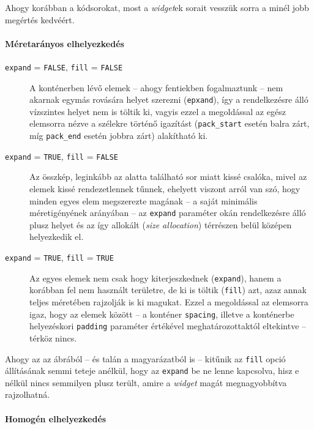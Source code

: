 Ahogy korábban a kódsorokat, most a \textit{widget}ek sorait vesszük sorra a minél jobb megértés kedvéért.

\paragraph{Méretarányos elhelyezkedés}

\begin{description}
 \item[\texttt{expand} = \texttt{FALSE}, \texttt{fill} = \texttt{FALSE}] A konténerben lévő elemek -- ahogy fentiekben fogalmaztunk -- nem akarnak egymás rovására helyet szerezni (\texttt{epxand}), így a rendelkezésre álló vízszintes helyet nem is töltik ki, vagyis ezzel a megoldással az egész elemsorra nézve a szélekre történő igazítást (\texttt{pack\_start} esetén balra zárt, míg \texttt{pack\_end} esetén jobbra zárt) alakítható ki.

 \item[\texttt{expand} = \texttt{TRUE}, \texttt{fill} = \texttt{FALSE}] Az összkép, leginkább az alatta található sor miatt kissé csalóka, mivel az elemek kissé rendezetlennek tűnnek, ehelyett viszont arról van szó, hogy minden egyes elem megszerezte magának -- a saját minimális méretigényének arányában -- az \texttt{expand} paraméter okán rendelkezésre álló plusz helyet és az így allokált (\textit{size allocation}) térrészen belül középen helyezkedik el.

 \item[\texttt{expand} = \texttt{TRUE}, \texttt{fill} = \texttt{TRUE}] Az egyes elemek nem csak hogy kiterjeszkednek (\texttt{expand}), hanem a korábban fel nem használt területre, de ki is töltik (\texttt{fill}) azt, azaz annak teljes méretében rajzolják is ki magukat. Ezzel a megoldással az elemsorra igaz, hogy az elemek között -- a konténer \texttt{spacing}, illetve a konténerbe helyezéskori \texttt{padding} paraméter értékével meghatározottaktól eltekintve -- térköz nincs.
\end{description}

Ahogy az az ábrából -- és talán a magyarázatból is -- kitűnik az \texttt{fill} opció állításának semmi teteje anélkül, hogy az \texttt{expand} be ne lenne kapcsolva, hisz e nélkül nincs semmilyen plusz terült, amire a \textit{widget} magát megnagyobbítva rajzolhatná.

\paragraph{Homogén elhelyezkedés}


